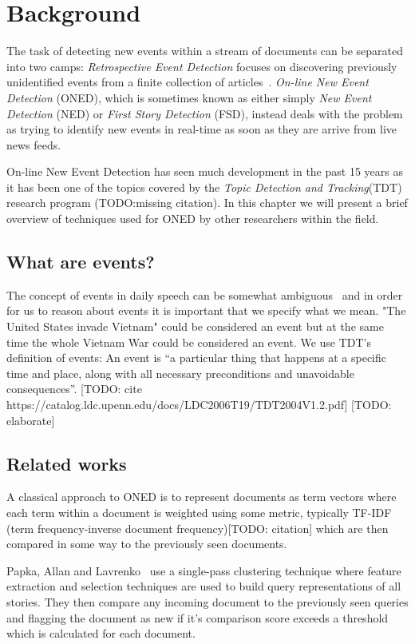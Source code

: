 \chapter{Background}
\label{chapter:background}

The task of detecting new events within a stream of documents can be separated into two camps: \emph{Retrospective Event Detection} focuses on discovering previously unidentified events from a finite collection of articles~\cite{yang1998study}. \emph{On-line New Event Detection} (ONED), which is sometimes known as either simply \emph{New Event Detection} (NED) or \emph{First Story Detection} (FSD), instead deals with the problem as trying to identify new events in real-time as soon as they are arrive from live news feeds.

On-line New Event Detection has seen much development in the past 15 years as it has been one of the topics covered by the \emph{Topic Detection and Tracking}(TDT) research program (TODO:missing citation). In this chapter we will present a brief overview of techniques used for ONED by other researchers within the field.

\section{What are events?}
The concept of events in daily speech can be somewhat ambiguous~\cite{papka1999online} and in order for us to reason about events it is important that we specify what we mean. "The United States invade Vietnam" could be considered an event but at the same time the whole Vietnam War could be considered an event. We use TDT's definition of events: An event is ``a particular thing that happens at a specific time and place, along with all necessary preconditions and unavoidable consequences''. [TODO: cite https://catalog.ldc.upenn.edu/docs/LDC2006T19/TDT2004V1.2.pdf]
[TODO: elaborate]

\section{Related works}
A classical approach to ONED is to represent documents as term vectors where each term within a document is weighted using some metric, typically TF-IDF (term frequency-inverse document frequency)[TODO: citation] which are then compared in some way to the previously seen documents.

Papka, Allan and Lavrenko~\cite{papka1998online} use a single-pass clustering technique where feature extraction and selection techniques are used to build query representations of all stories. They then compare any incoming document to the previously seen queries and flagging the document as new if it's comparison score exceeds a threshold which is calculated for each document.

